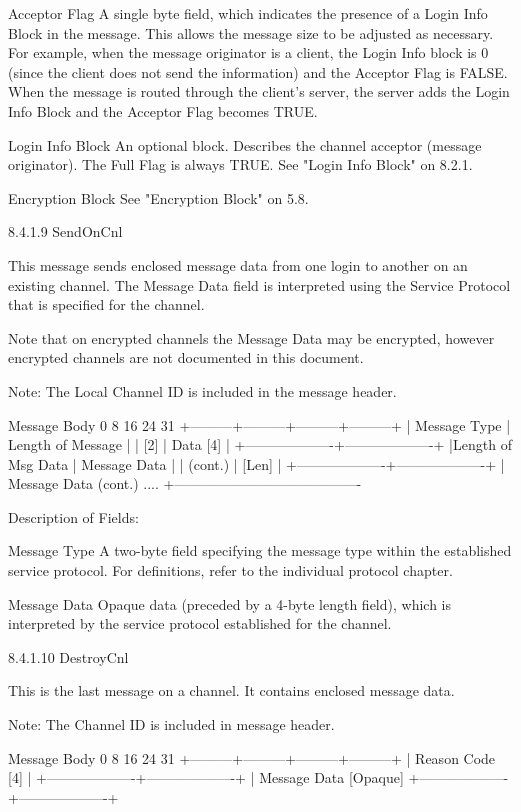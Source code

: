 \documentclass[titlepage,oneside]{book}
\begin{document}
Acceptor Flag
  A single byte field, which indicates the presence of a Login Info
  Block in the message. This allows the message size to be adjusted as
  necessary. For example, when the message originator is a client, the
  Login Info block is 0 (since the client does not send the
  information) and the Acceptor Flag is FALSE. When the message is
  routed through the client's server, the server adds the Login Info
  Block and the Acceptor Flag becomes TRUE.

Login Info Block
  An optional block. Describes the channel acceptor (message
  originator). The Full Flag is always TRUE. See "Login Info Block" on
  8.2.1.

Encryption Block
  See "Encryption Block" on 5.8.


8.4.1.9 SendOnCnl

This message sends enclosed message data from one login to another on
an existing channel. The Message Data field is interpreted using the
Service Protocol that is specified for the channel.

Note that on encrypted channels the Message Data may be encrypted,
however encrypted channels are not documented in this document.

Note: The Local Channel ID is included in the message header.


Message Body
0         8         16        24      31
+---------+---------+---------+---------+
|    Message Type   | Length of Message |
|        [2]        |  Data [4]         |
+-------------------+-------------------+
|Length of Msg Data |  Message Data     |
|       (cont.)     |     [Len]         |
+-------------------+-------------------+
|      Message Data (cont.) ....
+----------------------------------------

Description of Fields:

Message Type
  A two-byte field specifying the message type within the established
  service protocol. For definitions, refer to the individual protocol
  chapter.

Message Data
  Opaque data (preceded by a 4-byte length field), which is
  interpreted by the service protocol established for the channel.


8.4.1.10 DestroyCnl

This is the last message on a channel. It contains enclosed message
data.

Note: The Channel ID is included in message header.

Message Body
0         8         16        24      31
+---------+---------+---------+---------+
|            Reason Code [4]            |
+-------------------+-------------------+
| Message Data [Opaque]
+-------------------+-------------------+
\end{document}
